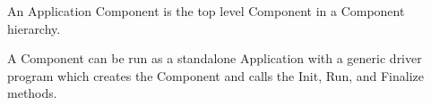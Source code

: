%


An Application Component is the top level Component in a
Component hierarchy.

A Component can be run as a standalone Application
with a generic driver program which creates
the Component and calls the Init, Run, and Finalize methods.

